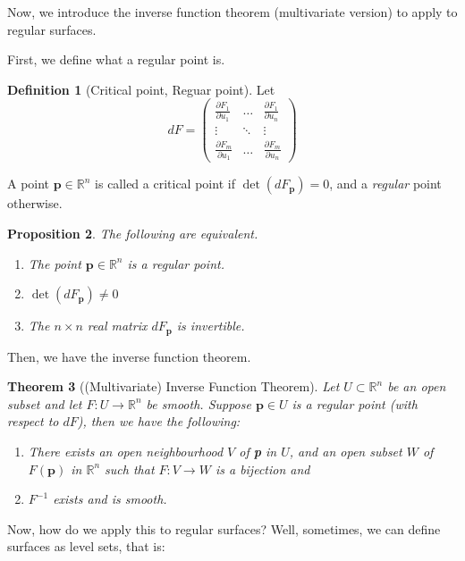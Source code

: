 \documentclass[10pt, a4paper]{article}
\newcommand{\R}{\mathbb{R}}
\theoremstyle{plain}
\newtheorem{theorem}{Theorem}[section]
\newtheorem{proposition}[theorem]{Proposition}
\theoremstyle{definition}
\newtheorem{definition}[theorem]{Definition}
\theoremstyle{remark}
\begin{document}
Now, we introduce the inverse function theorem (multivariate version) to apply to regular surfaces.


First, we define what a regular point is.

\begin{definition}[Critical point, Reguar point]
Let $$dF=\begin{pmatrix}
    \frac{\partial F_1}{\partial u_1} &\dots & \frac{\partial F_1}{\partial u_n}\\
     \vdots & \ddots & \vdots \\
     \frac{\partial F_m}{\partial u_1} & \dots & \frac{\partial F_m}{\partial u_n}
    
\end{pmatrix}$$

A point $\textbf{p} \in \R^n$ is called a critical point if $\det(dF_\textbf{p}) =0$, and a \textit{regular} point otherwise.
\end{definition}


\begin{proposition}
    The following are equivalent.
    \begin{enumerate}
        \item The point $\textbf{p} \in \R^n$ is a regular point.
        \item $\det(dF_\textbf{p}) \neq 0$
        \item The $n \times n$ real matrix $dF_\textbf{p}$ is invertible.
    \end{enumerate}
\end{proposition}

Then, we have the inverse function theorem.

\begin{theorem}[(Multivariate) Inverse Function Theorem]\label{thm: inverse-fn-thm-multi}
    Let $U \subset \R^n$ be an open subset and let $F: U \to \R^n$ be smooth. Suppose $\textbf{p} \in U$ is a regular point (with respect to $dF$), then we have the following:
    \begin{enumerate}
        \item There exists an open neighbourhood $V$ of \textbf{p} in $U$, and an open subset $W $ of $F(\textbf{p})$ in $\R^n$ such that $F: V \to W$ is a bijection and 
        
        \item $F^{-1}$ exists and is smooth.
     \end{enumerate}
\end{theorem}


Now, how do we apply this to regular surfaces? Well, sometimes, we can define surfaces as level sets, that is:
\end{document}
